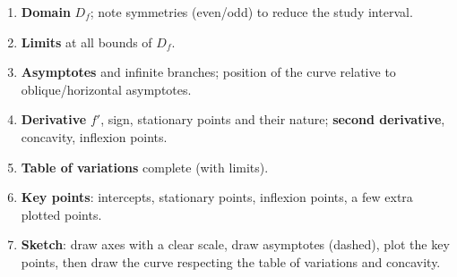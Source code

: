 \documentclass[11pt]{article}
\begin{document}
\begin{methode}
\begin{enumerate}
\item \textbf{Domain} $D_f$; note symmetries (even/odd) to reduce the study interval.
\item \textbf{Limits} at all bounds of $D_f$.
\item \textbf{Asymptotes} and infinite branches; position of the curve relative to oblique/horizontal asymptotes.
\item \textbf{Derivative} $f'$, sign, stationary points and their nature; \textbf{second derivative}, concavity, inflexion points.
\item \textbf{Table of variations} complete (with limits).
\item \textbf{Key points}: intercepts, stationary points, inflexion points, a few extra plotted points.
\item \textbf{Sketch}: draw axes with a clear scale, draw asymptotes (dashed), plot the key points, then draw the curve respecting the table of variations and concavity.
\end{enumerate}
\end{methode}
\end{document}
